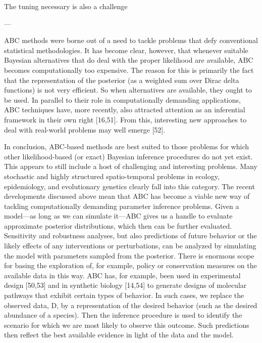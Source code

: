 The tuning necessary is also a challenge

---

ABC methods were borne out of a need to tackle problems that defy conventional statistical methodologies. It has become clear, however, that whenever suitable Bayesian alternatives that do deal with the proper likelihood are available, ABC becomes computationally too expensive. The reason for this is primarily the fact that the representation of the posterior (as a weighted sum over Dirac delta functions) is not very efficient. So when alternatives are available, they ought to be used. In parallel to their role in computationally demanding applications, ABC techniques have, more recently, also attracted attention as an inferential framework in their own right [16,51]. From this, interesting new approaches to deal with real-world problems may well emerge [52].

In conclusion, ABC-based methods are best suited to those problems for which other likelihood-based (or exact) Bayesian inference procedures do not yet exist. This appears to still include a host of challenging and interesting problems. Many stochastic and highly structured spatio-temporal problems in ecology, epidemiology, and evolutionary genetics clearly fall into this category. The recent developments discussed above mean that ABC has become a viable new way of tackling computationally demanding parameter inference problems. Given a model—as long as we can simulate it—ABC gives us a handle to evaluate approximate posterior distributions, which then can be further evaluated. Sensitivity and robustness analyses, but also predictions of future behavior or the likely effects of any interventions or perturbations, can be analyzed by simulating the model with parameters sampled from the posterior. There is enormous scope for basing the exploration of, for example, policy or conservation measures on the available data in this way. ABC has, for example, been used in experimental design [50,53] and in synthetic biology [14,54] to generate designs of molecular pathways that exhibit certain types of behavior. In such cases, we replace the observed data, D, by a representation of the desired behavior (such as the desired abundance of a species). Then the inference procedure is used to identify the scenario for which we are most likely to observe this outcome. Such predictions then reflect the best available evidence in light of the data and the model.


